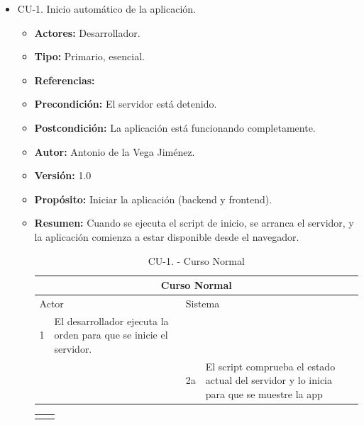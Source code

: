 \begin{itemize}
  \item CU-1. Inicio automático de la aplicación.
  \begin{itemize}
    \item \textbf{Actores:} Desarrollador.
    \item \textbf{Tipo:} Primario, esencial.
    \item \textbf{Referencias:}
    \item \textbf{Precondición:} El servidor está detenido.
    \item \textbf{Postcondición:} La aplicación está funcionando completamente.
    \item \textbf{Autor:} Antonio de la Vega Jiménez.
    \item \textbf{Versión:} 1.0
    \item \textbf{Propósito:} Iniciar la aplicación (backend y frontend).
    \item \textbf{Resumen:} Cuando se ejecuta el script de inicio, se arranca el servidor, y la aplicación comienza a estar disponible desde el navegador.
    \begin{table}[H]
      \centering
      \begin{tabularx}{\textwidth}{|l|X|l|X|}
        \hline
        \multicolumn{4}{|c|}{\cellcolor[HTML]{C0C0C0}Curso Normal}                                                 \\ \hline
        \multicolumn{2}{|l|}{\cellcolor[HTML]{EFEFEF}Actor} & \multicolumn{2}{l|}{\cellcolor[HTML]{EFEFEF}Sistema} \\ \hline
        1                         & El desarrollador ejecuta la orden para que se inicie el servidor.                        &                            &                         \\ \hline
                                  &                         & 2a                          & El script comprueba el estado actual del servidor y lo inicia para que se muestre la app                        \\ \hline
      \end{tabularx}
      \caption{CU-1. - Curso Normal}
      \label{my-label}
    \end{table}
    \begin{table}[H]
      \centering
      \begin{tabularx}{\textwidth}{|l|X|}
       \hline
       \rowcolor[HTML]{C0C0C0} 

\end{tabularx}
\end{table}
\end{itemize}
\end{itemize}
